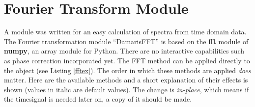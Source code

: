 \documentclass[12pt, a4paper, BCOR10mm, twoside, titlepage, headinclude]{scrbook}
\begin{document}
\section{Fourier Transform Module}
A module was written for an easy calculation of spectra from time domain data. The Fourier transformation module ``DamarisFFT'' is based on the \textbf{fft} module of \textbf{numpy}, an array module for Python. There are no interactive capabilities such as phase correction incorporated yet. The FFT method can be applied directly to the object (see Listing \ref{fftex}). The order in which these methods are applied \emph{does} matter. Here are the available methods and a short explanation of their effects is shown (values in italic are default values).
The change is \emph{in-place}, which means if the timesignal is needed later on, a copy of it should be made.
\end{document}
